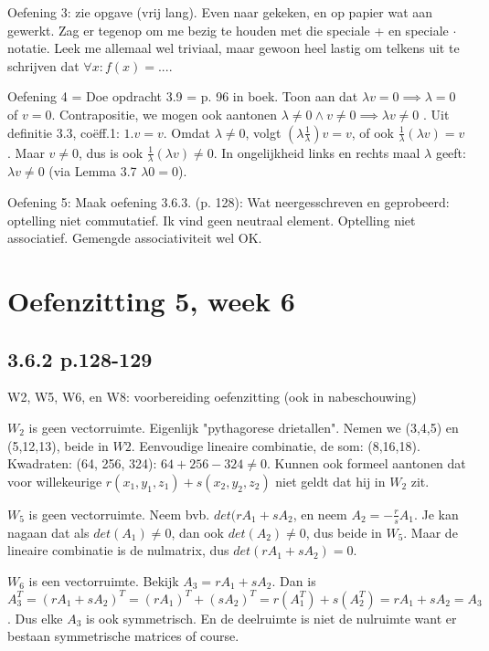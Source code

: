 \documentclass{article}
\begin{document}
Oefening 3: zie opgave (vrij lang). Even naar gekeken, en op papier wat aan gewerkt. Zag er tegenop om me bezig te houden met die speciale + en speciale $\cdot$ notatie. Leek me allemaal wel triviaal, maar gewoon heel lastig om telkens uit te schrijven dat $\forall x: f(x)=...$. 

Oefening 4 = Doe opdracht 3.9 = p. 96 in boek. Toon aan dat $\lambda v = 0 \implies \lambda = 0$ of $v=0$. Contrapositie, we mogen ook aantonen $\lambda \neq 0 \land v \neq 0 \implies  \lambda v \neq 0$ . Uit definitie 3.3, co\"eff.1: $1.v = v$. Omdat $\lambda \neq 0$, volgt $ (\lambda \frac{1}{\lambda}) v = v$, of ook $  \frac{1}{\lambda} ( \lambda v ) = v$. Maar $v \neq 0$, dus is ook $  \frac{1}{\lambda} ( \lambda v ) \neq 0 $. In ongelijkheid links en rechts maal $\lambda$ geeft: $ \lambda v \neq 0$ (via Lemma 3.7 $\lambda 0 = 0$). 

Oefening 5: Maak oefening 3.6.3. (p. 128): Wat neergesschreven en geprobeerd: optelling niet commutatief. Ik vind geen neutraal element. Optelling niet associatief. Gemengde associativiteit wel OK.  



\section{Oefenzitting 5, week 6}

\subsection{3.6.2 p.128-129}

W2, W5, W6, en W8: voorbereiding oefenzitting (ook in nabeschouwing)

$W_2$ is geen vectorruimte. Eigenlijk "pythagorese drietallen". Nemen we (3,4,5) en (5,12,13), beide in $W2$. Eenvoudige lineaire combinatie, de som: (8,16,18).   Kwadraten: (64, 256, 324): $64 + 256 - 324 \neq 0$. 
Kunnen ook formeel aantonen dat voor willekeurige $r(x_1,y_1,z_1) + s(x_2,y_2,z_2)$ niet geldt dat hij in $W_2$ zit. 

$W_5$ is geen vectorruimte. Neem bvb. $det(rA_1 + sA_2$, en neem $A_2 = -\frac{r}{s} A_1$. Je kan nagaan dat als $det(A_1) \neq 0$, dan ook $det(A_2) \neq 0$, dus beide in $W_5$. Maar de lineaire combinatie is de nulmatrix, dus $det(rA_1 + sA_2) = 0$. 

$W_6$ is een vectorruimte. Bekijk $A_3 = rA_1 + sA_2$. Dan is $A_3^T = (rA_1 + sA_2)^T = (rA_1)^T + (sA_2)^T = r(A_1^T) + s(A_2^T) = rA_1 + sA_2 = A_3$. Dus elke $A_3$ is ook symmetrisch. En de deelruimte is niet de nulruimte want er bestaan symmetrische matrices of course. 
\end{document}
